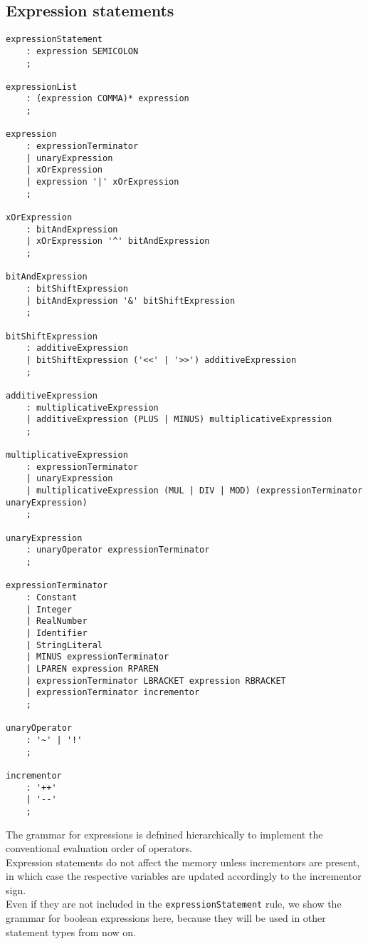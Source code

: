\documentclass[12pt,a4paper]{report}
\theoremstyle{definition}
\theoremstyle{definition}
\theoremstyle{definition}
\begin{document}
\subsection{Expression statements}
\begin{lstlisting}
expressionStatement
    : expression SEMICOLON
    ;
    
expressionList
    : (expression COMMA)* expression
    ;

expression
    : expressionTerminator
    | unaryExpression
    | xOrExpression
    | expression '|' xOrExpression
    ;

xOrExpression
    : bitAndExpression
    | xOrExpression '^' bitAndExpression
    ;

bitAndExpression
    : bitShiftExpression
    | bitAndExpression '&' bitShiftExpression
    ;

bitShiftExpression
    : additiveExpression
    | bitShiftExpression ('<<' | '>>') additiveExpression
    ;

additiveExpression
    : multiplicativeExpression
    | additiveExpression (PLUS | MINUS) multiplicativeExpression
    ;

multiplicativeExpression
    : expressionTerminator
    | unaryExpression
    | multiplicativeExpression (MUL | DIV | MOD) (expressionTerminator unaryExpression)
    ;

unaryExpression
    : unaryOperator expressionTerminator
    ;

expressionTerminator
    : Constant
    | Integer
    | RealNumber
    | Identifier
    | StringLiteral
    | MINUS expressionTerminator
    | LPAREN expression RPAREN
    | expressionTerminator LBRACKET expression RBRACKET
    | expressionTerminator incrementor
    ;

unaryOperator
    : '~' | '!'
    ;

incrementor
    : '++'
    | '--'
    ;
\end{lstlisting}
The grammar for expressions is defnined hierarchically to implement the conventional evaluation order of operators.\\
Expression statements do not affect the memory unless incrementors are present, in which case the respective variables are updated accordingly to the incrementor sign.\\
Even if they are not included in the \texttt{expressionStatement} rule, we show the grammar for boolean expressions here, because they will be used in other statement types from now on.\\
\end{document}
